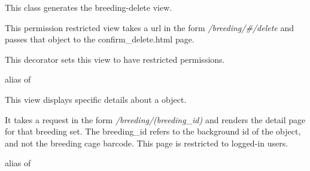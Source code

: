 \documentclass[letterpaper,10pt,english]{sphinxmanual}
\begin{document}
\begin{fulllineitems}
\label{animals:mousedb.animal.views.BreedingDelete}
This class generates the breeding-delete view.

This permission restricted view takes a url in the form \emph{/breeding/\#/delete} and passes that object to the confirm\_delete.html page.

\begin{fulllineitems}
\label{animals:mousedb.animal.views.BreedingDelete.dispatch}
This decorator sets this view to have restricted permissions.

\end{fulllineitems}


\begin{fulllineitems}
\label{animals:mousedb.animal.views.BreedingDelete.model}
alias of 

\end{fulllineitems}


\end{fulllineitems}


\begin{fulllineitems}
\label{animals:mousedb.animal.views.BreedingDetail}
This view displays specific details about a {\hyperref[animals:mousedb.animal.models.Breeding]{}} object.

It takes a request in the form \emph{/breeding/(breeding\_id)} and renders the detail page for that breeding set.
The breeding\_id refers to the background id of the {\hyperref[animals:mousedb.animal.models.Breeding]{}} object, and not the breeding cage barcode.
This page is restricted to logged-in users.

\begin{fulllineitems}
\label{animals:mousedb.animal.views.BreedingDetail.model}
alias of 

\end{fulllineitems}


\end{fulllineitems}
\end{document}
